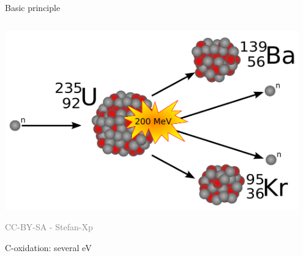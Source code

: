 \documentclass[presentation]{beamer}
\begin{document}
\begin{frame}[label=sec-1-2]{Basic principle}
\begin{columns}
\begin{column}{0.45\textwidth}
\begin{varblock}[\textwidth]{}
\includegraphics[width=0.95\textwidth]{images/Kernspaltung}
\end{varblock}
\vspace{-0.4cm}
 \tiny \textcolor{gray}{CC-BY-SA - Stefan-Xp}

\normalsize
    C-oxidation: several eV
\end{column}
\end{columns}
\end{frame}
\end{document}
